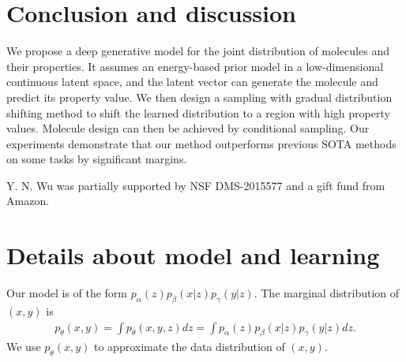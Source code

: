 \documentclass[accepted]{uai2023} %
\begin{document}
\section{Conclusion and discussion}
We propose a deep generative model for the joint distribution of molecules and their properties. It assumes an energy-based prior model in a low-dimensional continuous latent space, and the latent vector can generate the molecule and predict its property value.  
We then design a sampling with gradual distribution shifting method to shift the learned distribution to a region with high property values. Molecule design can then be achieved by conditional sampling. Our experiments demonstrate that our method outperforms previous SOTA methods on some tasks by significant margins. 


\begin{acknowledgements} %
Y. N. Wu was partially supported by NSF DMS-2015577 and a gift fund from Amazon.
\end{acknowledgements}


\appendix
\onecolumn %

\section{Details about model and learning} 
\label{sec:a0}

Our model is of the form $p_\alpha(z)p_\beta(x|z) p_\gamma(y|z)$. The marginal distribution of $(x, y)$ is 
\begin{align*}
    p_\theta(x, y) = \int p_\theta(x, y, z) dz 
    = \int p_\alpha(z) p_\beta(x|z) p_\gamma(y|z) dz. 
\end{align*}
We use $p_\theta(x, y)$ to approximate the data distribution of $(x, y)$. 
\end{document}

